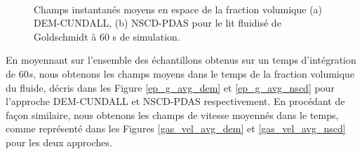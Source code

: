 \begin{figure}[h!]
\centering
\hspace{4em}%
   \\
\caption{\centering Champs instantanés moyens en espace de la fraction volumique (a) DEM-CUNDALL, (b) NSCD-PDAS pour le lit fluidisé de Goldschmidt à 60 s de simulation.}\label{ep_g_60s}
\end{figure}

En moyennant sur l'ensemble des échantillons obtenus sur un temps d'intégration de $60s$, nous obtenons les champs moyens dans le temps de la fraction volumique du fluide, décris dans les Figure \ref{ep_g_avg_dem} et \ref{ep_g_avg_nscd} pour l'approche DEM-CUNDALL et NSCD-PDAS respectivement. En procédant de façon similaire, nous obtenons les champs de vitesse moyennés dans le temps, comme représenté dans les Figures \ref{gas_vel_avg_dem} et \ref{gas_vel_avg_nscd} pour les deux approches.

